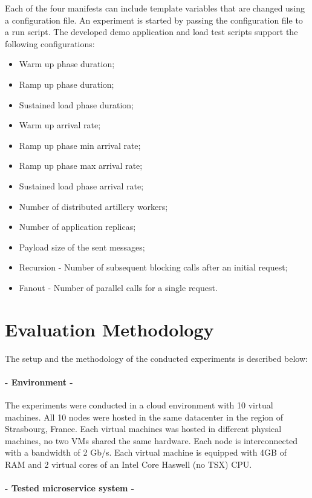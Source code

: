 Each of the four manifests can include template variables that are changed using a configuration file.
An experiment is started by passing the configuration file to a run script.
The developed demo application and load test scripts support the following configurations:
\begin{itemize}
    \setlength\itemsep{0em}
    \item Warm up phase duration;
    \item Ramp up phase duration;
    \item Sustained load phase duration;
    \item Warm up arrival rate;
    \item Ramp up phase min arrival rate;
    \item Ramp up phase max arrival rate;
    \item Sustained load phase arrival rate;
    \item Number of distributed artillery workers;
    \item Number of application replicas;
    \item Payload size of the sent messages;
    \item Recursion - Number of subsequent blocking calls after an initial request;
    \item Fanout - Number of parallel calls for a single request.
\end{itemize}

\section{Evaluation Methodology} %
\label{sec:evaluation_methodology}

The setup and the methodology of the conducted experiments is described below:

\paragraph{- Environment -}

The experiments were conducted in a cloud environment with 10 virtual machines.
All 10 nodes were hosted in the same datacenter in the region of Strasbourg, France.
Each virtual machines was hosted in different physical machines, no two VMs shared the same hardware.
Each node is interconnected with a bandwidth of 2 Gb/s.
Each virtual machine is equipped with 4GB of RAM and 2 virtual cores of an Intel Core Haswell (no TSX) CPU.

\paragraph{- Tested microservice system -}

